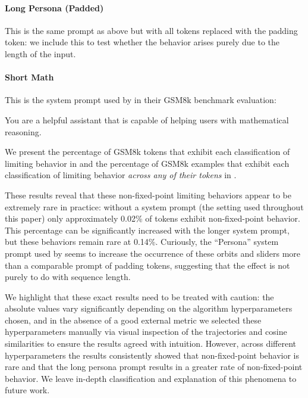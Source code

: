 \paragraph{Long Persona (Padded)} This is the same prompt as above but with all tokens replaced with the padding token: we include this to test whether the behavior arises purely due to the length of the input.

\paragraph{Short Math} This is the system prompt used by \citet{geiping2025scaling} in their GSM8k benchmark evaluation:
\begin{tcolorbox}[colback=gray!10, colframe=gray!50, arc=5pt]
You are a helpful assistant that is capable of helping users with mathematical reasoning.
\end{tcolorbox}

We present the percentage of GSM8k tokens that exhibit each classification of limiting behavior in  and the percentage of GSM8k examples that exhibit each classification of limiting behavior \emph{across any of their tokens} in .

These results reveal that these non-fixed-point limiting behaviors appear to be extremely rare in practice: without a system prompt (the setting used throughout this paper) only approximately 0.02\% of tokens exhibit non-fixed-point behavior. This percentage can be significantly increased with the longer system prompt, but these behaviors remain rare at 0.14\%. Curiously, the ``Persona'' system prompt used by \citet{geiping2025scaling} seems to increase the occurrence of these orbits and sliders more than a comparable prompt of padding tokens, suggesting that the effect is not purely to do with sequence length.

We highlight that these exact results need to be treated with caution: the absolute values vary significantly depending on the algorithm hyperparameters chosen, and in the absence of a good external metric we selected these hyperparameters manually via visual inspection of the trajectories and cosine similarities to ensure the results agreed with intuition. However, across different hyperparameters the results consistently showed that non-fixed-point behavior is rare and that the long persona prompt results in a greater rate of non-fixed-point behavior. We leave in-depth classification and explanation of this phenomena to future work.

